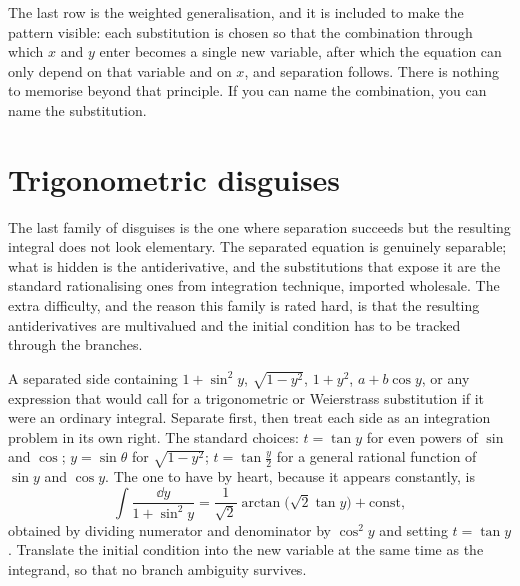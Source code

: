 The last row is the weighted generalisation, and it is included to make the pattern visible: each substitution is chosen so that the combination through which $x$ and $y$ enter becomes a single new variable, after which the equation can only depend on that variable and on $x$, and separation follows. There is nothing to memorise beyond that principle. If you can name the combination, you can name the substitution.

\section{Trigonometric disguises}

The last family of disguises is the one where separation succeeds but the resulting integral does not look elementary. The separated equation is genuinely separable; what is hidden is the antiderivative, and the substitutions that expose it are the standard rationalising ones from integration technique, imported wholesale. The extra difficulty, and the reason this family is rated hard, is that the resulting antiderivatives are multivalued and the initial condition has to be tracked through the branches.

\cue A separated side containing $1+\sin^{2}y$, $\sqrt{1-y^{2}}$, $1+y^{2}$, $a+b\cos y$, or any expression that would call for a trigonometric or Weierstrass substitution if it were an ordinary integral.
\method Separate first, then treat each side as an integration problem in its own right. The standard choices: $t=\tan y$ for even powers of $\sin$ and $\cos$; $y=\sin\theta$ for $\sqrt{1-y^{2}}$; $t=\tan\tfrac y2$ for a general rational function of $\sin y$ and $\cos y$. The one to have by heart, because it appears constantly, is
\[\int\frac{\dd y}{1+\sin^{2}y}=\frac{1}{\sqrt2}\arctan\bigl(\sqrt2\tan y\bigr)+\text{const},\]
obtained by dividing numerator and denominator by $\cos^{2}y$ and setting $t=\tan y$. Translate the initial condition into the new variable at the same time as the integrand, so that no branch ambiguity survives.

